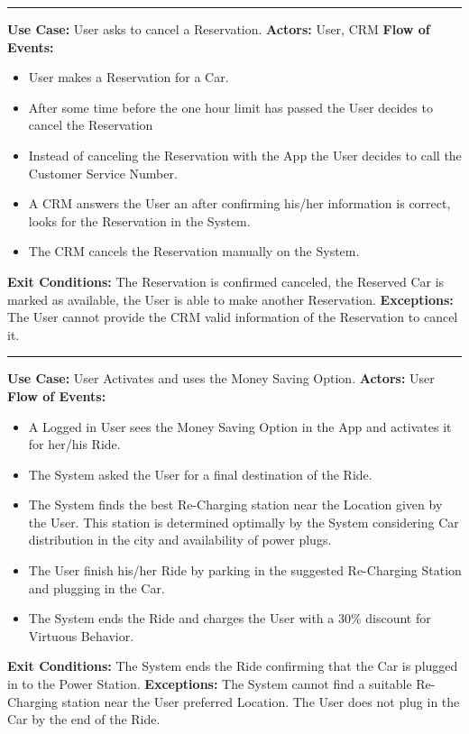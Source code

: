\documentclass[a4paper]{article}
\begin{document}
\begin{center}
\rule{8cm}{0.4pt}
\end{center}
\textbf{Use Case:} User asks to cancel a Reservation.
\newline
\textbf{Actors:} User, CRM
\newline
\textbf{Flow of Events:}
\begin{itemize}
\item User makes a Reservation for a Car.
\item After some time before the one hour limit has passed the User decides to cancel the Reservation
\item Instead of canceling the Reservation with the App the User decides to call the Customer Service Number.
\item A CRM answers the User an after confirming his/her information is correct, looks for the Reservation in the System.
\item The CRM cancels the Reservation manually on the System.
\end{itemize}
\textbf{Exit Conditions:} The Reservation is confirmed canceled, the Reserved Car is marked as available, the User is able to make another Reservation.
\newline
\textbf{Exceptions:} The User cannot provide the CRM valid information of the Reservation to cancel it.
\newline

\begin{center}
\rule{8cm}{0.4pt}
\end{center}
\textbf{Use Case:} User Activates and uses the Money Saving Option.
\newline
\textbf{Actors:} User
\newline
\textbf{Flow of Events:}
\begin{itemize}
\item A Logged in User sees the Money Saving Option in the App and activates it for her/his Ride.
\item The System asked the User for a final destination of the Ride.
\item The System finds the best Re-Charging station near the Location given by the User. This station is determined optimally by the System considering Car distribution in the city and availability of power plugs.
\item The User finish his/her Ride by parking in the suggested Re-Charging Station and plugging in the Car.
\item The System ends the Ride and charges the User with a 30\% discount for Virtuous Behavior.
\end{itemize}
\textbf{Exit Conditions:} The System ends the Ride confirming that the Car is plugged in to the Power Station.
\newline
\textbf{Exceptions:} The System cannot find a suitable Re-Charging station near the User preferred Location. The User does not plug in the Car by the end of the Ride.
\newline
\end{document}
